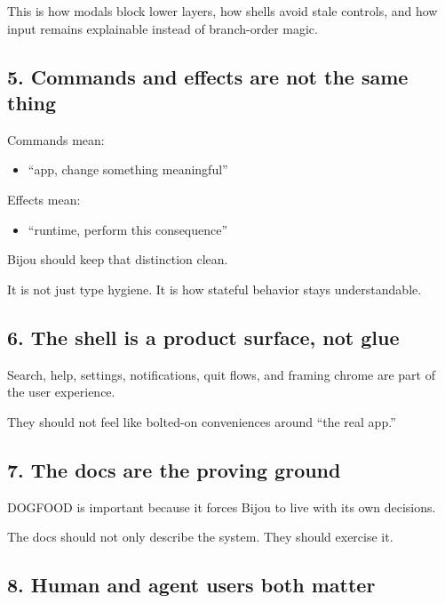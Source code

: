 This is how modals block lower layers, how shells avoid stale controls, and how input remains explainable instead of branch-order magic.

\subsection{5. Commands and effects are not the same thing}\label{record-035-commands-and-effects-are-not-the-same-thing}

Commands mean:

\begin{itemize}
\tightlist
\item
  ``app, change something meaningful''
\end{itemize}

Effects mean:

\begin{itemize}
\tightlist
\item
  ``runtime, perform this consequence''
\end{itemize}

Bijou should keep that distinction clean.

It is not just type hygiene. It is how stateful behavior stays understandable.

\subsection{6. The shell is a product surface, not glue}\label{record-035-the-shell-is-a-product-surface-not-glue}

Search, help, settings, notifications, quit flows, and framing chrome are part of the user experience.

They should not feel like bolted-on conveniences around ``the real app.''

\subsection{7. The docs are the proving ground}\label{record-035-the-docs-are-the-proving-ground}

DOGFOOD is important because it forces Bijou to live with its own decisions.

The docs should not only describe the system. They should exercise it.

\subsection{8. Human and agent users both matter}\label{record-035-human-and-agent-users-both-matter}

